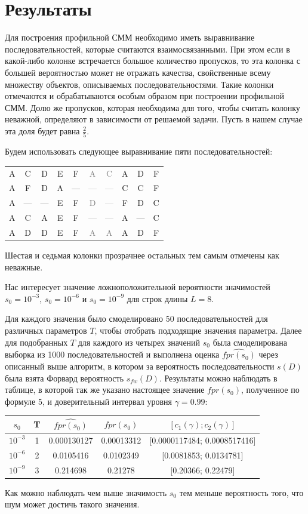 \documentclass[]{article}
\begin{document}
			\section{Результаты}						
			Для построения профильной СММ необходимо иметь выравнивание последовательностей, которые считаются взаимосвязанными. При этом если в какой-либо колонке встречается большое количество пропусков, то эта колонка с большей вероятностью может не отражать качества, свойственные всему множеству объектов, описываемых последовательностями. Такие колонки отмечаются и обрабатываются особым образом при построении профильной СММ. Долю же пропусков, которая необходима для того, чтобы считать колонку неважной, определяют в зависимости от решаемой задачи. Пусть в нашем случае эта доля будет равна $\frac{2}{5}$.
			
			Будем использовать следующее выравнивание пяти последовательностей:
			\begin{center}
				\begin{tabular}{cccccccccc}
					A&C&D&E&F&\textcolor{gray}{A}&\textcolor{gray}{C}&A&D&F\\
					A&F&D&A&—&\textcolor{gray}{—}&\textcolor{gray}{—}&C&C&F\\
					A&—&—&E&F&\textcolor{gray}{D}&\textcolor{gray}{—}&F&D&C\\
					A&C&A&E&F&\textcolor{gray}{—}&\textcolor{gray}{—}&A&—&C\\
					A&D&D&E&F&\textcolor{gray}{A}&\textcolor{gray}{A}&A&D&F
				\end{tabular}
			\end{center}
			Шестая и седьмая колонки прозрачнее остальных тем самым отмечены как неважные.
			
			Нас интересует значение ложноположительной вероятности значимостей $s_{0}=10^{-3}$, $s_{0}=10^{-6}$ и $s_{0}=10^{-9}$ для строк длины $L=8$.
			
			Для каждого значения было смоделировано 50 последовательностей для различных параметров $T$, чтобы отобрать подходящие значения параметра. Далее для подобранных $T$ для каждого из четырех значений $s_{0}$ была смоделирована выборка из 1000 последовательностей и выполнена оценка $\widehat{fpr(s_{0})}$ через описанный выше алгоритм, в котором за вероятность последовательности $s(D)$ была взята Форвард вероятность $s_{fw}(D)$. Результаты можно наблюдать в таблице, в которой так же указано настоящее значение $fpr(s_0)$, полученное по формуле 5, и доверительный интервал уровня $\gamma = 0.99$:
			\begin{center}
				\begin{tabular}{ccccc}
					$s_{0}$&T&$\widehat{fpr(s_{0})}$&$fpr(s_{0})$&$[c_{1}(\gamma);c_{2}(\gamma)]$  \\ \hline
					$10^{-3}$&1&0.000130127&0.00013312&[0.0000117484; 0.0008517416] \\
					$10^{-6}$&2&0.0105416&0.0102349&[0.0081853; 0.0134781] \\
					$10^{-9}$&3&0.214698&0.21278&[0.20366; 0.22479] \\					
				\end{tabular}
			\end{center}
			Как можно наблюдать чем выше значимость $s_{0}$ тем меньше вероятность того, что шум может достичь такого значения.
			
\end{document}
